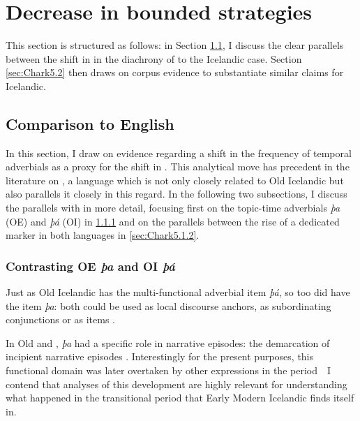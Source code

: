 \documentclass[output=paper,colorlinks,citecolor=brown]{langscibook}
\begin{document}
\section{Decrease in bounded strategies}\label{sec:Chark5}

This section is structured as follows: in Section \ref{sec:Chark5.1}, I discuss the clear parallels between the shift in  in the diachrony of  to the Icelandic case. Section \ref{sec:Chark5.2} then draws on corpus evidence to substantiate similar claims for Icelandic.

\subsection{Comparison to English}\label{sec:Chark5.1}

In this section, I draw on evidence regarding a shift in the frequency of temporal adverbials as a proxy for the shift in . This analytical move has precedent in the literature on , a language which is not only closely related to Old Icelandic but also parallels it closely in this regard. In the following two subsections, I discuss the parallels with  in more detail, focusing first on the topic-time adverbials \textit{þa} (OE) and \textit{þá} (OI) in \ref{sec:Chark5.1.1} and on the parallels between the rise of a dedicated  marker in both languages in \ref{sec:Chark5.1.2}. 

\subsubsection{Contrasting OE \textit{þa} and OI \textit{þá}}\label{sec:Chark5.1.1}

Just as Old Icelandic has the multi-functional adverbial item\textit{ þá}, so too did  have the item \textit{þa}: both could be used as local discourse anchors, as subordinating conjunctions or as  items \citep{Brinton1996, enkvist1987old}.

In Old and , \textit{þa} had a specific role in narrative episodes: the demarcation of incipient narrative episodes \citep{enkvist1987old, warvik1995a}. Interestingly for the present purposes, this functional domain was later overtaken by other expressions in the  period\ \textendash{}\  I contend that analyses of this development are highly relevant for understanding what happened in the transitional period that Early Modern Icelandic finds itself in.
\end{document}
